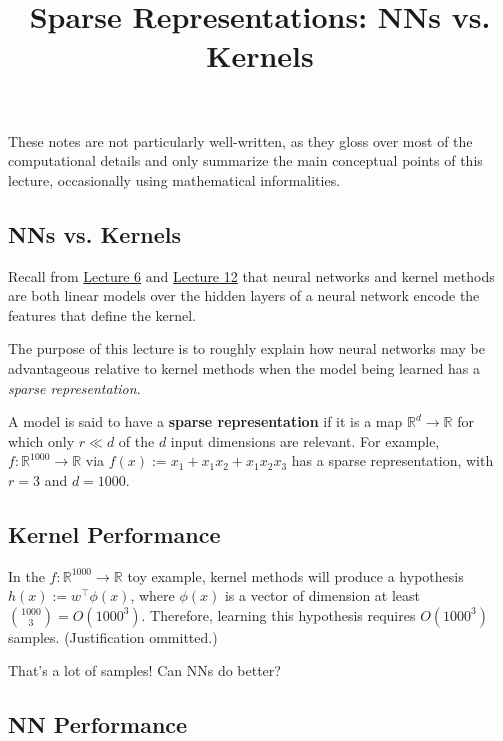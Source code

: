 \title{Sparse Representations: NNs vs. Kernels}



\begin{remark}
    These notes are not particularly well-written,
    as they gloss over most of the computational details
    and only summarize the main conceptual points
    of this lecture, occasionally using mathematical informalities.
\end{remark}

\subsection{NNs vs. Kernels}

Recall from \href{/6.790/lectures/6/#kernels-unlimited-features}{Lecture 6}
and \href{/6.790/lectures/12}{Lecture 12}
that neural networks and kernel methods
are both linear models over 
the hidden layers of a neural network
encode the features that define the kernel.

The purpose of this lecture
is to roughly explain how neural networks
may be advantageous relative to kernel methods
when the model being learned
has a \emph{sparse representation}.

A model is said to have a \textbf{sparse representation}
if it is a map $\mathbb{R}^d \to \mathbb{R}$
for which only $r \ll d$ of the $d$ input dimensions
are relevant.
For example, $f \colon \mathbb{R}^{1000} \to \mathbb{R}$
via $f(x) := x_1 + x_1x_2 + x_1x_2x_3$ has a sparse representation,
with $r = 3$ and $d = 1000$.

\subsection{Kernel Performance}

In the $f \colon \mathbb{R}^{1000} \to \mathbb{R}$ toy example,
kernel methods will produce a hypothesis
$h(x) := w^{\top} \phi(x)$, where
$\phi(x)$ is a vector of dimension at least
$\binom{1000}{3} = O(1000^3)$.
Therefore, learning this hypothesis
requires $O(1000^3)$ samples.
(Justification ommitted.)

That's a lot of samples!  Can NNs do better?

\subsection{NN Performance}

